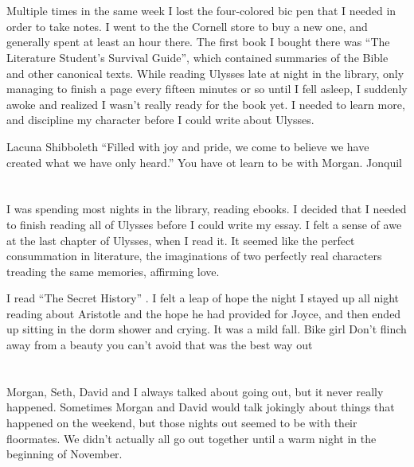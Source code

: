 \section{}

Multiple times in the same week I lost the four-colored bic pen that I needed in
order to take notes.  I went to the the Cornell store to buy a new one, and
generally spent at least an hour there.  The first book I bought there was ``The
Literature Student's Survival Guide'', which contained summaries of the Bible
and other canonical texts.  While reading Ulysses late at night in the library,
only managing to finish a page every fifteen minutes or so until I fell asleep,
I suddenly awoke and realized I wasn't really ready for the book yet.  I needed
to learn more, and discipline my character before I could write about Ulysses.  

Lacuna
Shibboleth
``Filled with joy and pride, we come to believe we have created what we have
only heard.''
You have ot learn to be with Morgan.
Jonquil


\section{}

I was spending most nights in the library, reading ebooks.  I decided that I
needed to finish reading all of Ulysses before I could write my essay.  I felt a
sense of awe at the last chapter of Ulysses, when I read it.  It seemed like the
perfect consummation in literature, the imaginations of two perfectly real
characters treading the same memories, affirming love. 

I read ``The Secret History'' .  I felt a leap of
hope the night I stayed up all night reading about Aristotle and the hope he had
provided for Joyce, and then ended up sitting in the dorm shower and crying.
It was a mild fall.  
Bike girl
Don't flinch away from a beauty you can't avoid
that was the best way out

\section{}

Morgan, Seth, David and I always talked about going out, but it never really
happened.  Sometimes Morgan and David would talk jokingly about things that
happened on the weekend, but those nights out seemed to be with their
floormates.  We didn't actually all go out together until a warm night in the
beginning of November.  

